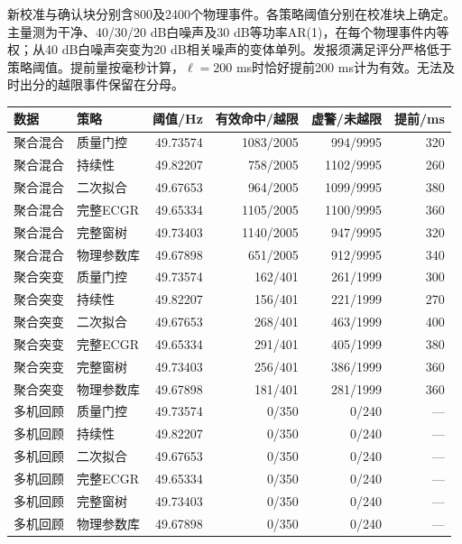 \documentclass[UTF8,a4paper,11pt]{ctexart}
\begin{document}
新校准与确认块分别含800及2400个物理事件。各策略阈值分别在校准块上确定。主量测为干净、40/30/20 dB白噪声及30 dB等功率AR(1)，在每个物理事件内等权；从40 dB白噪声突变为20 dB相关噪声的变体单列。发报须满足评分严格低于策略阈值。提前量按毫秒计算，$\ell=200$ ms时恰好提前200 ms计为有效。无法及时出分的越限事件保留在分母。
\begin{center}\small\setlength{\tabcolsep}{4pt}
\label{tab:abs-new}
\begin{tabular}{llrrrr}\toprule
数据 & 策略 & 阈值/Hz & 有效命中/越限 & 虚警/未越限 & 提前/ms \\ \midrule
聚合混合 & 质量门控 & 49.73574 & 1083/2005 & 994/9995 & 320 \\
聚合混合 & 持续性 & 49.82207 & 758/2005 & 1102/9995 & 260 \\
聚合混合 & 二次拟合 & 49.67653 & 964/2005 & 1099/9995 & 380 \\
聚合混合 & 完整ECGR & 49.65334 & 1105/2005 & 1100/9995 & 360 \\
聚合混合 & 完整窗树 & 49.73403 & 1140/2005 & 947/9995 & 320 \\
聚合混合 & 物理参数库 & 49.67898 & 651/2005 & 912/9995 & 340 \\
聚合突变 & 质量门控 & 49.73574 & 162/401 & 261/1999 & 300 \\
聚合突变 & 持续性 & 49.82207 & 156/401 & 221/1999 & 270 \\
聚合突变 & 二次拟合 & 49.67653 & 268/401 & 463/1999 & 400 \\
聚合突变 & 完整ECGR & 49.65334 & 291/401 & 405/1999 & 380 \\
聚合突变 & 完整窗树 & 49.73403 & 256/401 & 386/1999 & 360 \\
聚合突变 & 物理参数库 & 49.67898 & 181/401 & 281/1999 & 360 \\
多机回顾 & 质量门控 & 49.73574 & 0/350 & 0/240 & — \\
多机回顾 & 持续性 & 49.82207 & 0/350 & 0/240 & — \\
多机回顾 & 二次拟合 & 49.67653 & 0/350 & 0/240 & — \\
多机回顾 & 完整ECGR & 49.65334 & 0/350 & 0/240 & — \\
多机回顾 & 完整窗树 & 49.73403 & 0/350 & 0/240 & — \\
多机回顾 & 物理参数库 & 49.67898 & 0/350 & 0/240 & — \\
\bottomrule\end{tabular}\end{center}
\end{document}
